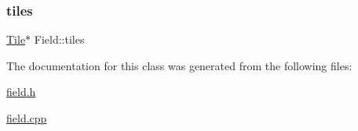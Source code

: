 \subsubsection{\texorpdfstring{tiles}{tiles}}
{\footnotesize\ttfamily \hyperlink{classTile}{Tile}$\ast$ Field\+::tiles\hspace{0.3cm}{\ttfamily [private]}}



The documentation for this class was generated from the following files\+:\begin{DoxyCompactItemize}
\item 
\hyperlink{field_8h}{field.\+h}\item 
\hyperlink{field_8cpp}{field.\+cpp}\end{DoxyCompactItemize}
